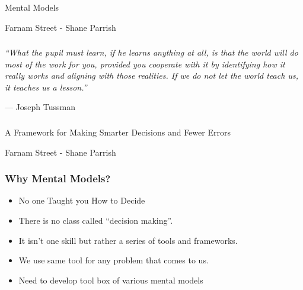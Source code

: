 \begin{frame}[fragile]\frametitle{}
\begin{center}
{\Large Mental Models}

{\small Farnam Street - Shane Parrish}


\end{center}
\end{frame}



\begin{frame}[fragile]\frametitle{}

\begin{center}
{\it 
``What the pupil must learn, if he learns anything at all, is that the world will do most of the work for you, provided you cooperate with it by identifying how it really works and aligning with those realities. If we do not let the world teach us, it teaches us a lesson.''


— Joseph Tussman
}

\end{center}
	  
\end{frame}

\begin{frame}[fragile]\frametitle{}
\begin{center}
{\large A Framework for Making Smarter Decisions and Fewer Errors}

{\small Farnam Street - Shane Parrish}


\end{center}
\end{frame}



\begin{frame}[fragile]\frametitle{Why Mental Models?}

\begin{itemize}
\item No one Taught you How to Decide
\item There is no class called ``decision making''. 
\item It isn’t one skill but rather a series of tools and frameworks.
\item We use same tool for any problem that comes to us.
\item Need to develop tool box of various mental models
\end{itemize}

\end{frame}


